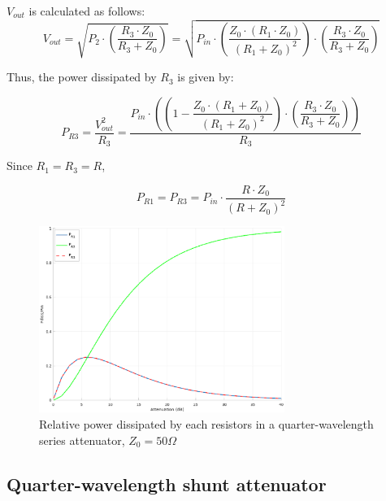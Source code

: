 \noindent $V_{out}$ is calculated as follows:
\begin{equation}
V_{out} = \sqrt{P_2 \cdot \left( \dfrac{R_3 \cdot Z_0}{R_3 + Z_0} \right)} = \sqrt{ P_{in} \cdot \left( \dfrac{Z_0 \cdot (R_1 \cdot Z_0)}{(R_1 + Z_0)^2} \right) \cdot \left( \dfrac{R_3 \cdot Z_0}{R_3 + Z_0}\right)}
\end{equation}

\noindent Thus, the power dissipated by $R_3$ is given by:

\begin{equation}
P_{R3} = \dfrac{V_{out}^2}{R_3} = \dfrac{P_{in} \cdot \left( \left( 1 - \dfrac{Z_0 \cdot (R_1 + Z_0)}{(R_1 + Z_0)^2}\right) \cdot \left( \dfrac{R_3 \cdot Z_0}{R_3 + Z_0}\right) \right)}{R_3}
\end{equation}

\noindent Since $R_1 = R_3 = R$,

\begin{equation}
P_{R1} = P_{R3} = P_{in} \cdot \dfrac{R \cdot Z_0}{(R + Z_0)^2}
\end{equation}


\begin{figure}[ht]
\begin{center}
\includegraphics[width=8cm]{bitmaps/synthesis/attenuators/Relative-dissipated-QW_series_Z0_50}
\end{center}
\caption{Relative power dissipated by each resistors in a quarter-wavelength series attenuator, $Z_{0} = 50\Omega$}
\label{fig:qw-series-attenuator-pow-diss}
\end{figure}
\FloatBarrier

\clearpage
\subsection{Quarter-wavelength shunt attenuator}


